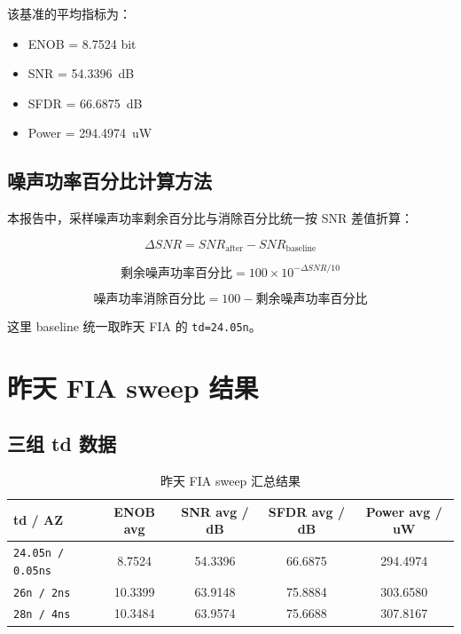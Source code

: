 \documentclass[12pt,a4paper]{ctexart}
\begin{document}
该基准的平均指标为：

\begin{itemize}
  \item ENOB = \num{8.7524} bit
  \item SNR = \SI{54.3396}{dB}
  \item SFDR = \SI{66.6875}{dB}
  \item Power = \SI{294.4974}{uW}
\end{itemize}

\subsection{噪声功率百分比计算方法}

本报告中，采样噪声功率剩余百分比与消除百分比统一按 SNR 差值折算：

\begin{equation}
\Delta SNR = SNR_{\text{after}} - SNR_{\text{baseline}}
\end{equation}

\begin{equation}
\text{剩余噪声功率百分比} = 100 \times 10^{-\Delta SNR / 10}
\end{equation}

\begin{equation}
\text{噪声功率消除百分比} = 100 - \text{剩余噪声功率百分比}
\end{equation}

这里 baseline 统一取昨天 FIA 的 \texttt{td=24.05n}。

\section{昨天 FIA sweep 结果}

\subsection{三组 td 数据}

\begin{table}[H]
\centering
\caption{昨天 FIA sweep 汇总结果}
\begin{tabular}{>{\raggedright\arraybackslash}p{2.8cm}cccc}
\toprule
td / AZ & ENOB avg & SNR avg / dB & SFDR avg / dB & Power avg / uW \\
\midrule
\texttt{24.05n / 0.05ns} & 8.7524 & 54.3396 & 66.6875 & 294.4974 \\
\texttt{26n / 2ns} & 10.3399 & 63.9148 & 75.8884 & 303.6580 \\
\texttt{28n / 4ns} & 10.3484 & 63.9574 & 75.6688 & 307.8167 \\
\bottomrule
\end{tabular}
\end{table}
\end{document}
